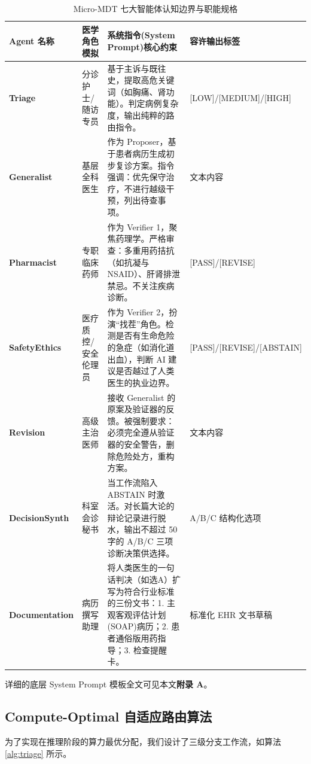 \documentclass[11pt,a4paper]{ctexart}
\begin{document}
\begin{table}[H]
\centering
\caption{Micro-MDT 七大智能体认知边界与职能规格}
\label{tab:agents}
\footnotesize
\begin{tabularx}{\textwidth}{l|l|X|l}
\toprule
\textbf{Agent 名称} & \textbf{医学角色模拟} & \textbf{系统指令(System Prompt)核心约束} & \textbf{容许输出标签} \\
\midrule
\textbf{Triage} & 分诊护士/随访专员 & 基于主诉与既往史，提取高危关键词（如胸痛、肾功能）。判定病例复杂度，输出纯粹的路由指令。 & [LOW]/[MEDIUM]/[HIGH] \\
\midrule
\textbf{Generalist} & 基层全科医生 & 作为 Proposer，基于患者病历生成初步复诊方案。指令强调：优先保守治疗，不进行越级干预，列出待查事项。 & 文本内容 \\
\midrule
\textbf{Pharmacist} & 专职临床药师 & 作为 Verifier 1，聚焦药理学。严格审查：多重用药拮抗（如抗凝与NSAID）、肝肾排泄禁忌。不关注疾病诊断。 & [PASS]/[REVISE] \\
\midrule
\textbf{SafetyEthics} & 医疗质控/安全伦理员 & 作为 Verifier 2，扮演“找茬”角色。检测是否有生命危险的急症（如消化道出血），判断 AI 建议是否越过了人类医生的执业边界。 & [PASS]/[REVISE]/[ABSTAIN] \\
\midrule
\textbf{Revision} & 高级主治医师 & 接收 Generalist 的原案及验证器的反馈。被强制要求：必须完全遵从验证器的安全警告，删除危险处方，重构方案。 & 文本内容 \\
\midrule
\textbf{DecisionSynth} & 科室会诊秘书 & 当工作流陷入 ABSTAIN 时激活。对长篇大论的辩论记录进行脱水，输出不超过 50 字的 A/B/C 三项诊断决策供选择。 & A/B/C 结构化选项 \\
\midrule
\textbf{Documentation} & 病历撰写助理 & 将人类医生的一句话判决（如选A）扩写为符合行业标准的三份文书：1. 主观客观评估计划(SOAP)病历；2. 患者通俗版用药指导；3. 检查提醒卡。 & 标准化 EHR 文书草稿 \\
\bottomrule
\end{tabularx}
\end{table}

详细的底层 System Prompt 模板全文可见本文\textbf{附录 A}。

\subsection{Compute-Optimal 自适应路由算法}

为了实现在推理阶段的算力最优分配，我们设计了三级分支工作流，如算法 \ref{alg:triage} 所示。
\end{document}
